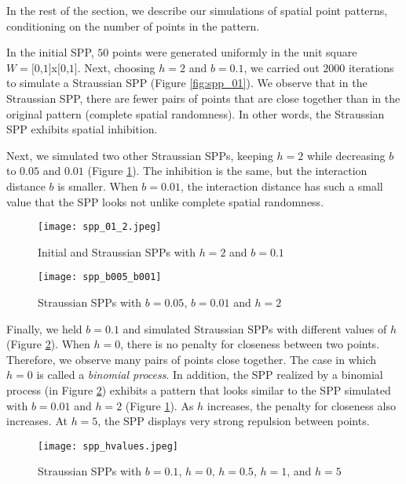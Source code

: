 \documentclass[12pt,openany]{article}
\theoremstyle{remark} %
\theoremstyle{definition} %
\begin{document}
In the rest of the section, we describe our simulations of spatial point patterns, conditioning on the number of points in the pattern.

In the initial SPP, $50$ points were generated uniformly in the unit square \\$W=[0$,$1]$x$[0$,$1]$. Next, choosing $h=2$ and $b=0.1$, we carried out $2000$ iterations to simulate a Straussian SPP (Figure \ref{fig:spp_01}). We observe that in the Straussian SPP, there are fewer pairs of points that are close together than in the original pattern (complete spatial randomness). In other words, the Straussian SPP exhibits spatial inhibition.

Next, we simulated two other Straussian SPPs, keeping $h=2$ while decreasing $b$ to $0.05$ and $0.01$ (Figure \ref{fig:spp_005_001}). The inhibition is the same, but the interaction distance $b$ is smaller. When $b = 0.01$, the interaction distance has such a small value that the SPP looks not unlike complete spatial randomness. 
\begin{figure}

\begin{center}\texttt{[image: spp\_01\_2.jpeg]}\end{center}
\caption{Initial and Straussian SPPs with $h=2$ and $b=0.1$} 
\label{fig:spp_01}

\begin{center}\texttt{[image: spp\_b005\_b001]}\end{center}
\caption{Straussian SPPs with $b=0.05$, $b=0.01$ and $h=2$}
\label{fig:spp_005_001}
\end{figure}

\newpage
Finally, we held $b=0.1$ and simulated Straussian SPPs with different values of $h$ (Figure \ref{fig:spp_hvalues}). When $h=0$, there is no penalty for closeness between two points. Therefore, we observe many pairs of points close together. The case in which $h=0$ is called a \textit{binomial process}. In addition, the SPP realized by a binomial process (in Figure \ref{fig:spp_hvalues}) exhibits a pattern that looks similar to the SPP simulated with $b=0.01$ and $h=2$ (Figure \ref{fig:spp_005_001}). As $h$ increases, the penalty for closeness also increases. At $h=5$, the SPP displays very strong repulsion between points. 

\begin{figure}
\begin{center}\texttt{[image: spp\_hvalues.jpeg]}\end{center}
\caption{Straussian SPPs with $b=0.1$, $h=0$, $h=0.5$, $h=1$, and $h=5$}
\label{fig:spp_hvalues}
\end{figure}
\end{document}
